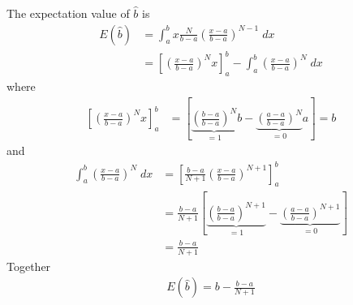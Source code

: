 The expectation value of $\hat{b}$ is
\begin{align}
    E(\hat{b})&=\int_{a}^{b}x\frac{N}{b-a}\left(\frac{x-a}{b-a}\right)^{N-1}\;dx
    \\&=\left[\left(\frac{x-a}{b-a}\right)^N x\right]_a^b-\int_{a}^{b}\left(\frac{x-a}{b-a}\right)^N\;dx
\end{align}
where
\begin{align}
    \left[\left(\frac{x-a}{b-a}\right)^N x\right]_a^b&=\left[\underbrace{\left(\frac{b-a}{b-a}\right)^N}_{=1}b-\underbrace{\left(\frac{a-a}{b-a}\right)^N}_{=0}a\right]=b
\end{align}
and
\begin{align}
    \int_{a}^{b}\left(\frac{x-a}{b-a}\right)^N\;dx&=\left[\frac{b-a}{N+1}\left(\frac{x-a}{b-a}\right)^{N+1}\right]_a^b
    \\&=\frac{b-a}{N+1}\left[\underbrace{\left(\frac{b-a}{b-a}\right)^{N+1}}_{=1}-\underbrace{\left(\frac{a-a}{b-a}\right)^{N+1}}_{=0}\right]
    \\&=\frac{b-a}{N+1}
\end{align}
Together
\begin{align}
    E(\hat{b})=b-\frac{b-a}{N+1}
\end{align}
